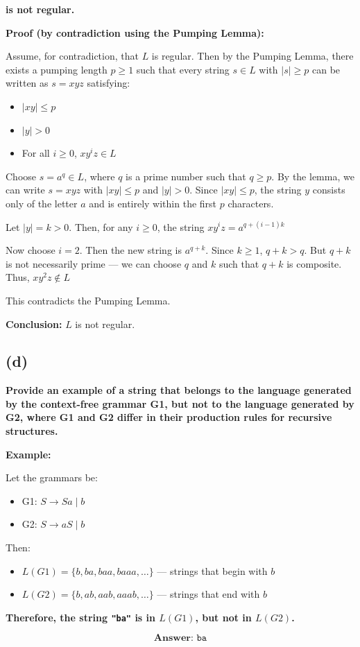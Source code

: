 \documentclass{article}
\begin{document}
\textbf{is not regular.}

\textbf{Proof (by contradiction using the Pumping Lemma):}

Assume, for contradiction, that \(L\) is regular.  
Then by the Pumping Lemma, there exists a pumping length \(p \geq 1\) such that every string \(s \in L\) with \(|s| \geq p\) can be written as \(s = xyz\) satisfying:

\begin{itemize}
  \item \(|xy| \leq p\)
  \item \(|y| > 0\)
  \item For all \(i \geq 0\), \(xy^i z \in L\)
\end{itemize}

Choose \(s = a^q \in L\), where \(q\) is a prime number such that \(q \geq p\).  
By the lemma, we can write \(s = xyz\) with \(|xy| \leq p\) and \(|y| > 0\).  
Since \(|xy| \leq p\), the string \(y\) consists only of the letter \(a\) and is entirely within the first \(p\) characters.

Let \(|y| = k > 0\).  
Then, for any \(i \geq 0\), the string \(xy^i z = a^{q + (i-1)k}\)

Now choose \(i = 2\).  
Then the new string is \(a^{q + k}\).  
Since \(k \geq 1\), \(q + k > q\).  
But \(q + k\) is not necessarily prime — we can choose \(q\) and \(k\) such that \(q + k\) is composite.  
Thus, \(xy^2 z \notin L\)

This contradicts the Pumping Lemma.

\textbf{Conclusion:} \(L\) is not regular.

\subsection*{(d)}

\textbf{Provide an example of a string that belongs to the language generated by the context-free grammar G1, but not to the language generated by G2, where G1 and G2 differ in their production rules for recursive structures.}

\textbf{Example:}

Let the grammars be:

\begin{itemize}
  \item G1: \(S \rightarrow S a \mid b\)
  \item G2: \(S \rightarrow a S \mid b\)
\end{itemize}

Then:

\begin{itemize}
  \item \(L(G1) = \{ b, ba, baa, baaa, \dots \}\) — strings that begin with \(b\)
  \item \(L(G2) = \{ b, ab, aab, aaab, \dots \}\) — strings that end with \(b\)
\end{itemize}

\textbf{Therefore, the string \texttt{"ba"} is in \(L(G1)\), but not in \(L(G2)\).}

\[
\textbf{Answer: } \boxed{\texttt{ba}}
\]
\end{document}
